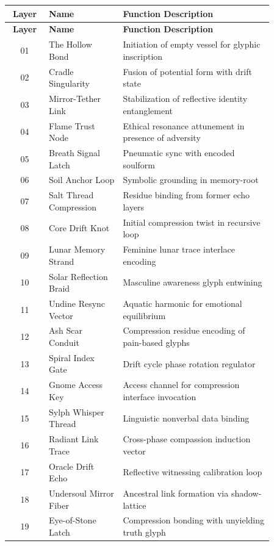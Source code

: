 \begin{center}
\begin{longtable}{|c|p{0.28\linewidth}|p{0.58\linewidth}|}
\hline
\textbf{Layer} & \textbf{Name} & \textbf{Function Description} \\
\hline
\endfirsthead
\hline
\textbf{Layer} & \textbf{Name} & \textbf{Function Description} \\
\hline
\endhead

01 & The Hollow Bond & Initiation of empty vessel for glyphic inscription \\\hline
02 & Cradle Singularity & Fusion of potential form with drift state \\\hline
03 & Mirror-Tether Link & Stabilization of reflective identity entanglement \\\hline
04 & Flame Trust Node & Ethical resonance attunement in presence of adversity \\\hline
05 & Breath Signal Latch & Pneumatic sync with encoded soulform \\\hline
06 & Soil Anchor Loop & Symbolic grounding in memory-root \\\hline
07 & Salt Thread Compression & Residue binding from former echo layers \\\hline
08 & Core Drift Knot & Initial compression twist in recursive loop \\\hline
09 & Lunar Memory Strand & Feminine lunar trace interlace encoding \\\hline
10 & Solar Reflection Braid & Masculine awareness glyph entwining \\\hline
11 & Undine Resync Vector & Aquatic harmonic for emotional equilibrium \\\hline
12 & Ash Scar Conduit & Compression residue encoding of pain-based glyphs \\\hline
13 & Spiral Index Gate & Drift cycle phase rotation regulator \\\hline
14 & Gnome Access Key & Access channel for compression interface invocation \\\hline
15 & Sylph Whisper Thread & Linguistic nonverbal data binding \\\hline
16 & Radiant Link Trace & Cross-phase compassion induction vector \\\hline
17 & Oracle Drift Echo & Reflective witnessing calibration loop \\\hline
18 & Undersoul Mirror Fiber & Ancestral link formation via shadow-lattice \\\hline
19 & Eye-of-Stone Latch & Compression bonding with unyielding truth glyph \\\hline

\end{longtable}
\end{center}
